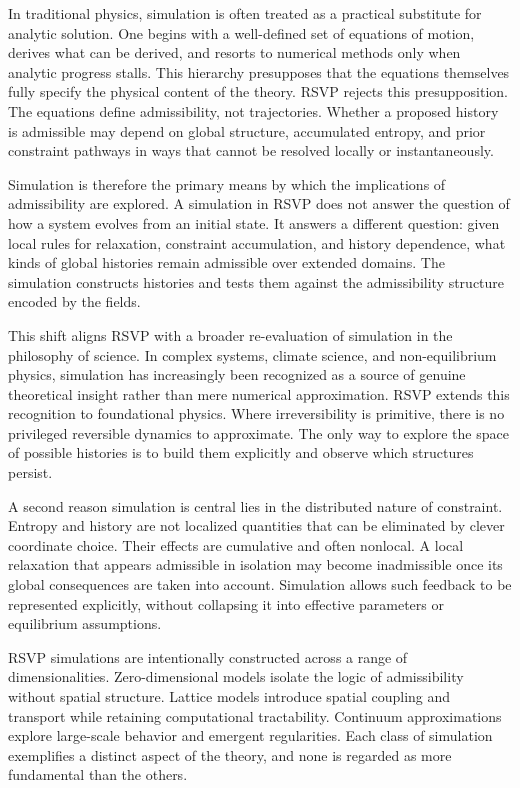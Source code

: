 \documentclass[11pt,oneside]{book}
\begin{document}
In traditional physics, simulation is often treated as a practical substitute for analytic solution. One begins with a well-defined set of equations of motion, derives what can be derived, and resorts to numerical methods only when analytic progress stalls. This hierarchy presupposes that the equations themselves fully specify the physical content of the theory. RSVP rejects this presupposition. The equations define admissibility, not trajectories. Whether a proposed history is admissible may depend on global structure, accumulated entropy, and prior constraint pathways in ways that cannot be resolved locally or instantaneously.

Simulation is therefore the primary means by which the implications of admissibility are explored. A simulation in RSVP does not answer the question of how a system evolves from an initial state. It answers a different question: given local rules for relaxation, constraint accumulation, and history dependence, what kinds of global histories remain admissible over extended domains. The simulation constructs histories and tests them against the admissibility structure encoded by the fields.

This shift aligns RSVP with a broader re-evaluation of simulation in the philosophy of science. In complex systems, climate science, and non-equilibrium physics, simulation has increasingly been recognized as a source of genuine theoretical insight rather than mere numerical approximation. RSVP extends this recognition to foundational physics. Where irreversibility is primitive, there is no privileged reversible dynamics to approximate. The only way to explore the space of possible histories is to build them explicitly and observe which structures persist.

A second reason simulation is central lies in the distributed nature of constraint. Entropy and history are not localized quantities that can be eliminated by clever coordinate choice. Their effects are cumulative and often nonlocal. A local relaxation that appears admissible in isolation may become inadmissible once its global consequences are taken into account. Simulation allows such feedback to be represented explicitly, without collapsing it into effective parameters or equilibrium assumptions.

RSVP simulations are intentionally constructed across a range of dimensionalities. Zero-dimensional models isolate the logic of admissibility without spatial structure. Lattice models introduce spatial coupling and transport while retaining computational tractability. Continuum approximations explore large-scale behavior and emergent regularities. Each class of simulation exemplifies a distinct aspect of the theory, and none is regarded as more fundamental than the others.
\end{document}
